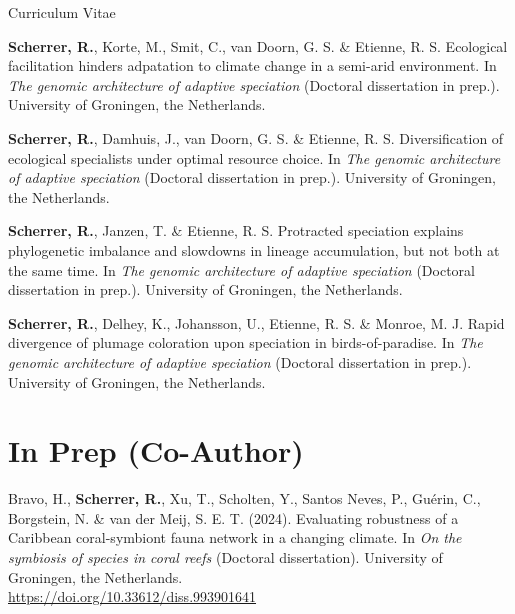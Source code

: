 \documentclass[11pt,a4paper]{article}
\begin{document}
\begin{cv}{Curriculum Vitae}
\begin{cvlist}{}
            \item[]
            \textbf{Scherrer, R.}, Korte, M., Smit, C., van Doorn, G. S. \& Etienne, R. S. Ecological facilitation hinders adpatation to climate change in a semi-arid environment.  In \textit{The genomic architecture of adaptive speciation} (Doctoral dissertation in prep.). University of Groningen, the Netherlands.

            \item[]
            \textbf{Scherrer, R.}, Damhuis, J., van Doorn, G. S. \& Etienne, R. S. Diversification of ecological specialists under optimal resource choice. In \textit{The genomic architecture of adaptive speciation} (Doctoral dissertation in prep.). University of Groningen, the Netherlands.

            \item[]
            \textbf{Scherrer, R.}, Janzen, T. \& Etienne, R. S. Protracted speciation explains phylogenetic imbalance and slowdowns in lineage accumulation, but not both at the same time. In \textit{The genomic architecture of adaptive speciation} (Doctoral dissertation in prep.). University of Groningen, the Netherlands.

            \item[]
            \textbf{Scherrer, R.}, Delhey, K., Johansson, U., Etienne, R. S. \& Monroe, M. J. Rapid divergence of plumage coloration upon speciation in birds-of-paradise. In \textit{The genomic architecture of adaptive speciation} (Doctoral dissertation in prep.). University of Groningen, the Netherlands.
 
        \end{cvlist}

        \section{In Prep (Co-Author)}

        \begin{cvlist}{}

            \item[]
            Bravo, H., \textbf{Scherrer, R.}, Xu, T., Scholten, Y., Santos Neves, P., Gu\'{e}rin, C., Borgstein, N. \& van der Meij, S. E. T. (2024). Evaluating robustness of a Caribbean coral-symbiont fauna network in a changing climate. In \textit{On the symbiosis of species in coral reefs} (Doctoral dissertation). University of Groningen, the Netherlands.\\
            \url{https://doi.org/10.33612/diss.993901641}


\end{cvlist}
\end{cv}
\end{document}
